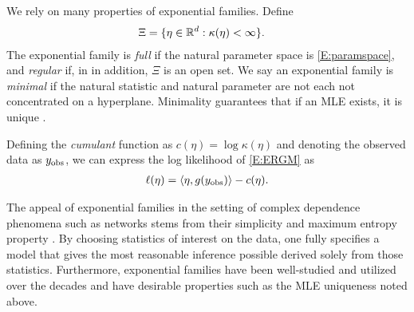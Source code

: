 We rely on many properties of exponential families.  Define 
\begin{align}
   \Xi &= \{ \eta \in {\mathbb R}^d : \kappa(\eta) < \infty \}.  \label{E:paramspace}
\end{align}
The exponential family is \emph{full} if the natural parameter  space is 
\eqref{E:paramspace}, and \emph{regular} if, in in addition, $\Xi$ is an open set.
We say an exponential family is \emph{minimal} if the natural statistic and 
natural parameter are not each not concentrated on a hyperplane. 
Minimality guarantees that if an MLE exists, it is unique \citep{Geyer:gdor}.


Defining the \emph{cumulant} function as $c(\eta) = \log \kappa(\eta)$ and
denoting the observed data as $y_{\text{obs}}$, we can express 
the log likelihood of \eqref{E:ERGM} as
\begin{align}
	\ell( \eta ) = \langle  \eta, g(y_{\text{obs}}) \rangle - c( \eta). \label{E:loglike}
\end{align}

The appeal of exponential families in the setting of complex dependence phenomena such 
as networks stems from their simplicity and maximum entropy property 
\citep{Jaynes:1978,Geyer:1992}.
By choosing statistics of interest on the data, one fully specifies a model that gives 
the 
most reasonable inference possible derived solely from those statistics.  
Furthermore, exponential families have been 
well-studied \citep{Barndorff,Brown:1986} and utilized over the decades and have 
desirable properties such as the MLE uniqueness noted above.


